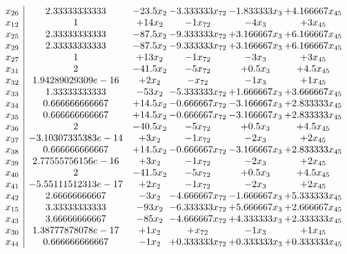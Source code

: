\documentclass[11pt]{article}
\begin{document}
\[\begin{array}{c| c c@{\hskip 2pt} c@{\hskip 2pt} c@{\hskip 2pt} c@{\hskip 2pt} }
 x_{26}   &  2.33333333333 & -23.5 x_{2} & -3.333333 x_{72} & -1.833333 x_{3} & + 4.166667 x_{45}\\
 x_{12}   &  1 & + 14 x_{2} & -1 x_{72} & -4 x_{3} & + 3 x_{45}\\
 x_{25}   &  2.33333333333 & -87.5 x_{2} & -9.333333 x_{72} & + 3.166667 x_{3} & + 6.166667 x_{45}\\
 x_{29}   &  2.33333333333 & -87.5 x_{2} & -9.333333 x_{72} & + 3.166667 x_{3} & + 6.166667 x_{45}\\
 x_{27}   &  1 & + 13 x_{2} & -1 x_{72} & -3 x_{3} & + 3 x_{45}\\
 x_{31}   &  2 & -41.5 x_{2} & -5 x_{72} & + 0.5 x_{3} & + 4.5 x_{45}\\
 x_{32}   &  1.94289029309e-16 & + 2 x_{2} & - x_{72} & -1 x_{3} & + 1 x_{45}\\
 x_{33}   &  1.33333333333 & -53 x_{2} & -5.333333 x_{72} & + 1.666667 x_{3} & + 3.666667 x_{45}\\
 x_{34}   &  0.666666666667 & + 14.5 x_{2} & -0.666667 x_{72} & -3.166667 x_{3} & + 2.833333 x_{45}\\
 x_{35}   &  0.666666666667 & + 14.5 x_{2} & -0.666667 x_{72} & -3.166667 x_{3} & + 2.833333 x_{45}\\
 x_{36}   &  2 & -40.5 x_{2} & -5 x_{72} & + 0.5 x_{3} & + 4.5 x_{45}\\
 x_{37}   &  -3.10307335383e-14 & + 3 x_{2} & -1 x_{72} & -2 x_{3} & + 2 x_{45}\\
 x_{38}   &  0.666666666667 & + 14.5 x_{2} & -0.666667 x_{72} & -3.166667 x_{3} & + 2.833333 x_{45}\\
 x_{39}   &  2.77555756156e-16 & + 3 x_{2} & -1 x_{72} & -2 x_{3} & + 2 x_{45}\\
 x_{40}   &  2 & -41.5 x_{2} & -5 x_{72} & + 0.5 x_{3} & + 4.5 x_{45}\\
 x_{41}   &  -5.55111512313e-17 & + 2 x_{2} & -1 x_{72} & -2 x_{3} & + 2 x_{45}\\
 x_{42}   &  2.66666666667 & -3 x_{2} & -4.666667 x_{72} & -1.666667 x_{3} & + 5.333333 x_{45}\\
 x_{15}   &  3.33333333333 & -93 x_{2} & -6.333333 x_{72} & + 5.666667 x_{3} & + 2.666667 x_{45}\\
 x_{43}   &  3.66666666667 & -85 x_{2} & -4.666667 x_{72} & + 4.333333 x_{3} & + 2.333333 x_{45}\\
 x_{30}   &  1.38777878078e-17 & + 1 x_{2} & +  x_{72} & -1 x_{3} & + 1 x_{45}\\
 x_{44}   &  0.666666666667 & -1 x_{2} & + 0.333333 x_{72} & + 0.333333 x_{3} & + 0.333333 x_{45}\\

\end{array}\]
\end{document}
